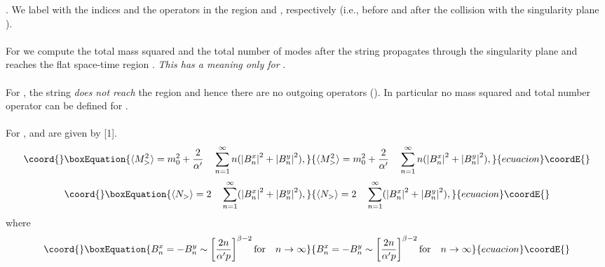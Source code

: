 \documentclass[12pt,a4paper]{article}
\begin{document}
\myHighlight{$\tau \rightarrow \infty $}\coordHE{}. We label with the indices \myHighlight{$<$}\coordHE{} and \myHighlight{$>$}\coordHE{} the 
operators in the region \coordHE{} and \coordHE{}, respectively (i.e., before 
and after the collision with the singularity plane \coordHE{}). \\ \\
For \coordHE{} we compute the total mass squared \coordHE{} and the total 
number of modes \coordHE{} after the string propagates through 
the singularity plane \coordHE{} and reaches the flat space-time region 
\coordHE{}. {\it This has a meaning only for} \coordHE{}. \\ \\
For \coordHE{}, the string {\it does not reach} the \coordHE{} region 
and hence 
there are no outgoing operators (\myHighlight{$>$}\coordHE{}). In particular no mass squared \coordHE{} 
and total number \coordHE{} operator can be defined for \coordHE{}. \\ \\
For \coordHE{}, \coordHE{} and \coordHE{} are 
given by [1].
\begin{equation}\coord{}\boxEquation{
\langle M^2_> \rangle = m^2_0 + \frac{2}{\alpha' } \quad \sum^\infty _{n=1} 
n(\left| B^x_n \right| ^2 + \left| B^y_n \right| ^2 ), 
}{
\langle M^2_> \rangle = m^2_0 + \frac{2}{\alpha' } \quad \sum^\infty _{n=1} 
n(\left| B^x_n \right| ^2 + \left| B^y_n \right| ^2 ), 
}{ecuacion}\coordE{}\end{equation}
\begin{equation}\coord{}\boxEquation{
 \langle N_> \rangle = 2\quad \sum^\infty _{n=1}
(\left| B^x_n \right| ^2 + \left| B^y_n \right| ^2 ), 
}{
 \langle N_> \rangle = 2\quad \sum^\infty _{n=1}
(\left| B^x_n \right| ^2 + \left| B^y_n \right| ^2 ), 
}{ecuacion}\coordE{}\end{equation} 
where
\begin{equation}\coord{}\boxEquation{
B^x_n = -B^y_n \sim \left[ \frac{2n}{\alpha' p} \right]^{\beta - 2} 
\mathrm{for}\quad n \rightarrow \infty 
}{
B^x_n = -B^y_n \sim \left[ \frac{2n}{\alpha' p} \right]^{\beta - 2} 
\mathrm{for}\quad n \rightarrow \infty 
}{ecuacion}\coordE{}\end{equation}
\end{document}
